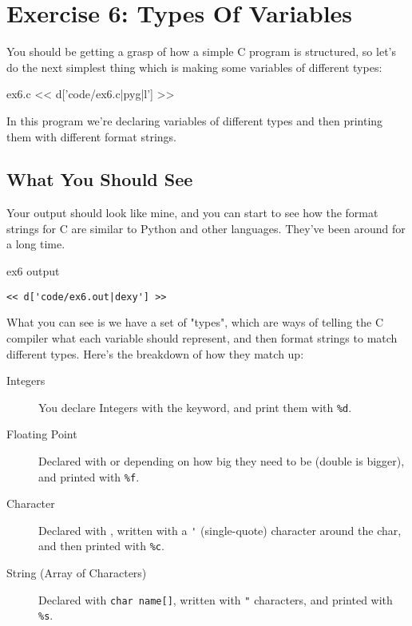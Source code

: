 \chapter{Exercise 6: Types Of Variables}

You should be getting a grasp of how a simple C program is structured,
so let's do the next simplest thing which is making some variables 
of different types:

\begin{code}{ex6.c}
<< d['code/ex6.c|pyg|l'] >>
\end{code}

In this program we're declaring variables of different types 
and then printing them with different  format
strings.

\section{What You Should See}

Your output should look like mine, and you can start to see how
the format strings for C are similar to Python and other languages.
They've been around for a long time.

\begin{code}{ex6 output}
\begin{lstlisting}
<< d['code/ex6.out|dexy'] >>
\end{lstlisting}
\end{code}

What you can see is we have a set of "types", which are ways of
telling the C compiler what each variable should represent, and then
format strings to match different types.  Here's the breakdown
of how they match up:

\begin{description}
\item[Integers] You declare Integers with the  keyword, and 
    print them with \verb|%d|.
\item[Floating Point] Declared with  or  depending
    on how big they need to be (double is bigger), and printed with 
    \verb|%f|.
\item[Character] Declared with , written with a \verb|'| (single-quote)
    character around the char, and then printed with \verb|%c|.
\item[String (Array of Characters)] Declared with \verb|char name[]|, 
    written with \verb|"| characters, and printed with \verb|%s|.
\end{description}

